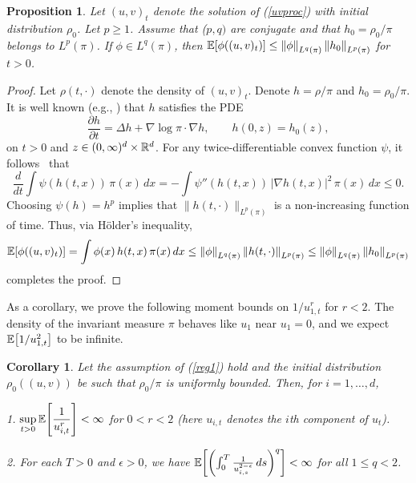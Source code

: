\documentclass[11pt, twoside]{report}
\newtheorem{corollary}[theorem]{Corollary}
\newtheorem{proposition}[theorem]{Proposition}
\begin{document}
\begin{proposition}\label{l1}Let $(u,v)_t$ denote the solution of (\ref{uvproc}) with initial distribution $\rho_0$. Let $p\geq 1$. Assume that ($p,q)$ are conjugate and that  $h_0=\rho_0/\pi$ belongs to $L^p(\pi)$. If $\phi \in L^q(\pi)$, then $\mean{ \phi((u,v)_t)}\le \norm{\phi}_{L^q(\pi)}\, \norm{h_0}_{L^p(\pi)}$ for $t>0$.
\end{proposition}
%
\begin{proof} Let $\rho(t,\cdot)$ denote the density of $(u,v)_t$. Denote $h=\rho/\pi$ and $h_0=\rho_0/\pi$. It is well known (e.g., \cite{Markowich2004-dw}) that $h$ satisfies the PDE
\[
\frac{\partial h}{\partial t}=\Delta h + \nabla \log \pi\cdot \nabla h,\qquad h(0,z)=h_0(z),
\]
on $t>0$ and $z\in(0,\infty)^d\times \mathbb{R}^d$. For any twice-differentiable convex function $\psi$, it follows~\cite[Eq.~9]{Markowich2004-dw}   that
\[
\frac{d}{dt} \int \psi(h(t,x))\, \pi(x)\,dx=-\int \psi''(h(t,x))\,|\nabla h(t,x)|^2\,\pi(x)\,dx\le 0.\]
Choosing $\psi(h)=h^p$ implies that $\|h(t,\cdot)\|_{L^p(\pi)}$ is a non-increasing function of time.
Thus, via H\"{o}lder's inequality,
 \begin{align*}
     \mean{\phi((u,v)_t)}
 =\int \phi(x)\,h(t,x)\, \pi(x)\, dx
 \le \norm{\phi}_{L^{q}(\pi)} \, \norm{h(t,\cdot)}_{L^p(\pi)} \le \norm{\phi}_{L^{q}(\pi)} \, \norm{h_0}_{L^p(\pi)}
 \end{align*}
 completes the proof.
\end{proof}
As a corollary, we prove the following moment bounds on $1/u_{1,t}^r$ for $r<2$. The density of the invariant measure $\pi$ behaves like $u_1$ near $u_1=0$, and we expect $\mathbb{E}\bp{1/u_{1,t}^2}$ to be infinite. 
\begin{corollary}\label{cor} Let the assumption of (\ref{reg1}) hold and the initial distribution $\rho_0((u,v))$ be such that $\rho_0/\pi$ is uniformly bounded.
Then, for $i=1,\dots,d$,

1. $\displaystyle\sup_{t>0}\mathbb{E} \bp{\frac 1{u_{i,t}^r}}<\infty$ for $0<r<2$ (here $u_{i,t}$ denotes the $i$th component of $u_t$).\vspace{1ex}

2. For each $T>0$ and $\epsilon>0$, we have
 $\mean{\pp{\int_0^T \frac{1}{u_{i,s}^{2-\epsilon}}\,ds}^q} <\infty $ for all $1 \le q < 2$.
  
\end{corollary}
\end{document}
